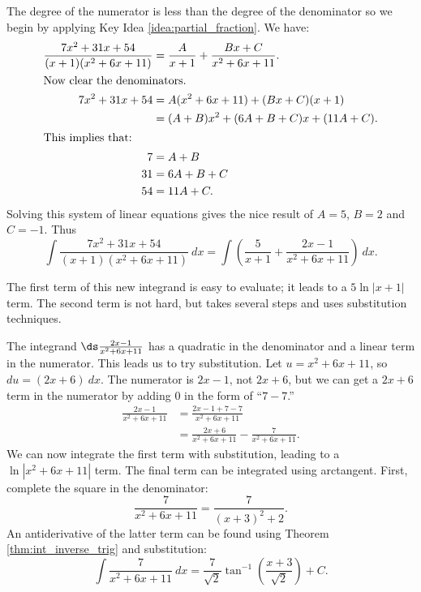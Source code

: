 {The degree of the numerator is less than the degree of the denominator so we begin by applying Key Idea \ref{idea:partial_fraction}. We have:
\begin{align*}
\frac{7x^2+31x+54}{(x+1)(x^2+6x+11)} &= \frac{A}{x+1} + \frac{Bx+C}{x^2+6x+11}. \\
\intertext{Now clear the denominators.}
7x^2+31x+54 &= A(x^2+6x+11) + (Bx+C)(x+1)\\
					&= (A+B)x^2 + (6A+B+C)x + (11A+C).\\
\intertext{This implies that:}
				7&=A+B\\
				31 &= 6A+B+C\\
				54 &= 11A+C.
\end{align*}
Solving this system of linear equations gives the nice result of $A=5$, $B = 2$ and $C=-1$. Thus
$$\int\frac{7x^2+31x+54}{(x+1)(x^2+6x+11)}\ dx = \int\left(\frac{5}{x+1} + \frac{2x-1}{x^2+6x+11}\right)\ dx.$$

The first term of this new integrand is easy to evaluate; it leads to a $5\ln|x+1|$ term. The second term is not hard, but takes several steps and uses substitution techniques.

The integrand $\ds \frac{2x-1}{x^2+6x+11}$ has a quadratic in the denominator and a linear term in the numerator. This leads us to try substitution. Let $u = x^2+6x+11$, so $du = (2x+6)\ dx$. The numerator is $2x-1$, not $2x+6$, but we can get a $2x+6$ term in the numerator by adding 0 in the form of ``$7-7$.''
\begin{align*}
\frac{2x-1}{x^2+6x+11} &= \frac{2x-1+7-7}{x^2+6x+11} \\
					&= \frac{2x+6}{x^2+6x+11} - \frac{7}{x^2+6x+11}.
\end{align*}
We can now integrate the first term with substitution, leading to a $\ln|x^2+6x+11|$ term. The final term can be integrated using arctangent. First, complete the square in the denominator:
$$\frac{7}{x^2+6x+11} = \frac{7}{(x+3)^2+2}.$$
An antiderivative of the latter term can be found using Theorem \ref{thm:int_inverse_trig} and substitution:
$$\int \frac{7}{x^2+6x+11}\ dx = \frac{7}{\sqrt{2}}\tan^{-1}\left(\frac{x+3}{\sqrt{2}}\right)+C.$$

}

